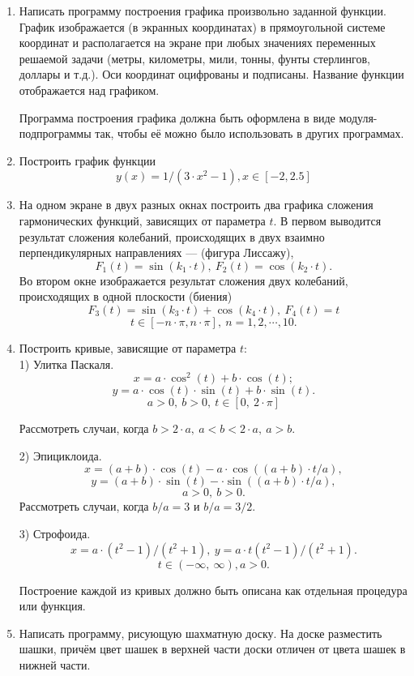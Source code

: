 \begin{enumerate}
\item Написать программу построения графика произвольно заданной функции. График изображается (в экранных координатах) в прямоугольной системе координат и располагается на экране при любых значениях переменных решаемой задачи (метры, километры, мили, тонны, фунты стерлингов, доллары и т.д.). Оси координат оцифрованы и подписаны. Название функции отображается над графиком.

Программа построения графика должна быть оформлена в виде модуля-подпрограммы так, чтобы её можно было использовать в других программах.

\item Построить график функции
$$y(x)= 1/(3\cdot x^2-1), x \in[-2,2.5]$$

\item На одном экране в двух разных окнах построить два графика сложения гармонических функций, зависящих от параметра $t$. В первом выводится результат сложения колебаний, происходящих в двух взаимно перпендикулярных направлениях --- (фигура Лиссажу),
$$F_1(t) = \sin(k_1\cdot t), \:F_2(t) = \cos(k_2\cdot t).$$
Во втором окне изображается результат сложения двух колебаний, происходящих в одной плоскости (биения)
$$F_3(t) = \sin(k_3\cdot t) + \cos(k_4\cdot t), \:F_4(t) = t$$
$$t\in [-n\cdot \pi, n\cdot \pi], \:n = 1,2,\cdots, 10.  $$

\item   Построить кривые, зависящие от параметра $t:$\\

 1) Улитка Паскаля.\\
$$x = a\cdot \cos^2(t) + b\cdot \cos(t);$$
$$ y = a\cdot \cos(t)\cdot\sin(t) + b\cdot\sin(t).$$
$$a > 0, \:b > 0,\: t \in[0,\:2\cdot \pi]$$

Рассмотреть случаи, когда $b > 2\cdot a, \: a < b < 2\cdot a, \: a > b.$

2) Эпициклоида.\\
$$x = (a + b)\cdot\cos(t) - a\cdot\cos((a + b)\cdot t / a),$$
$$y = (a + b)\cdot\sin(t) - \cdot\sin((a + b)\cdot t / a), $$
$$a > 0,\: b > 0.$$
Рассмотреть случаи, когда $b / a = 3$ и $b / a = 3 / 2.$

3) Строфоида.\\
$$x = a\cdot(t^2 -1)/(t^2 + 1), \:y = a\cdot t(t^2-1) / (t^2 +1).$$
$$ t \in (-\infty ,\:\infty),  a > 0.$$

Построение каждой из кривых должно быть описана как отдельная процедура или функция.

\item Написать программу, рисующую шахматную доску. На доске разместить шашки, причём цвет шашек в верхней части доски отличен от цвета шашек в нижней части.


\end{enumerate}
